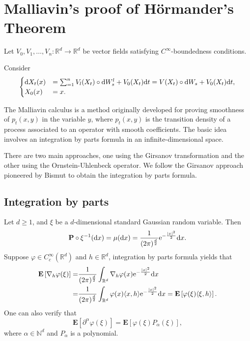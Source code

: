 \documentclass[twoside, 12pt]{book}
\numberwithin{equation}{chapter}
\def\mN{{\mathbb N}}
\def\mR{{\mathbb R}}
\def\bE{{\mathbf E}}
\def\bP{{\mathbf P}}
\def\l{\left}
\def\r{\right}
\def\<{\langle}
\def\>{\rangle}
\def\geq{\geqslant}
\def\d{\text{\rm{d}}}
\def\e{\mathrm{e}}
\begin{document}
	\chapter{Malliavin's proof of H\"ormander's Theorem}\label{chapt:hormander}
		
	Let $V_0, V_1, \ldots, V_n: \mathbb{R}^d \rightarrow \mathbb{R}^d$ be vector fields satisfying $C^{\infty}$-boundedness conditions. 
	 
     Consider 
     \begin{equation}\label{eq:sde-S}
     	\begin{cases}
     		 \d X_t(x)&= \sum_{=1}^n V_l (X_t)\circ \d W^l_s+ V_0(X_t) \d t= V (X_t)\circ \d W_s+ V_0(X_t) \d t, \\
     		 X_0(x)&=x.
     	\end{cases}
     \end{equation}
     
     The Malliavin calculus is a method originally developed for proving smoothness of $p_t(x,y)$ in the variable $y$, where $p_t(x,y)$ is the transition density of a process associated to an operator with smooth coefficients. The basic idea involves an integration by parts formula in an infinite-dimensional space.

     There are two main approaches, one using the Girsanov transformation and the other using the Ornstein-Uhlenbeck operator. We follow the Girsanov approach pioneered by Bismut \cite{bismut1981martingales} to obtain the integration by parts formula. 

    \section{Integration by parts}
    
    Let $d\geq 1$, and $\xi$ be a $d$-dimensional standard Gaussian random variable. Then 
    \[
    \bP\circ \xi^{-1}(\d x)=\mu(\d x)=\frac{1}{({2\pi})^{\frac{d}{2}}}\e^{-\frac{|x|^2}{2}} \d x. 
    \]
    Suppose $\varphi\in C_c^\infty(\mR^d)$ and $h\in \mR^d$, integration by parts formula yields that 
    \begin{equation}\label{eq:IBP1}
        \begin{aligned}
        \bE \l[\nabla_h \varphi(\xi)\r]=&\frac{1}{(2\pi)^{\frac{d}{2}}}\int_{\mR^d}\nabla_h \varphi(x)\e^{-\frac{|x|^2}{2}} \d x\\
        =&\frac{1}{(2\pi)^{\frac{d}{2}}}\int_{\mR^d} \varphi(x)\<x,h\> \e^{-\frac{|x|^2}{2}} \d x=\bE \l[\varphi(\xi)\<\xi,h\>\r]. 
        \end{aligned}
    \end{equation}
    One can also verify that 
    \begin{equation*}
        \bE [\partial^\alpha \varphi(\xi)]= \bE [\varphi(\xi)P_\alpha(\xi)], 
    \end{equation*}
    where $\alpha\in \mN^d$ and $P_\alpha$ is a polynomial. 
    
\end{document}
